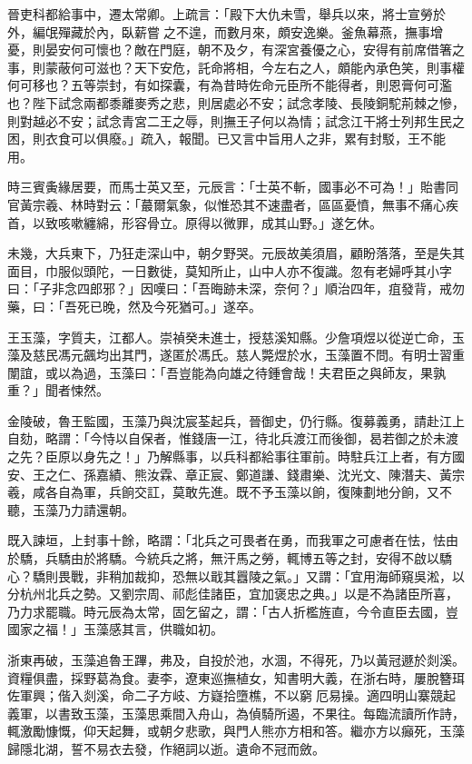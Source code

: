 \begin{pinyinscope}
晉吏科都給事中，遷太常卿。上疏言：「殿下大仇未雪，舉兵以來，將士宣勞於外，編氓殫藏於內，臥薪嘗之不遑，而數月來，頗安逸樂。釜魚幕燕，撫事增憂，則晏安何可懷也？敵在門庭，朝不及夕，有深宮養優之心，安得有前席借箸之事，則蒙蔽何可滋也？天下安危，託命將相，今左右之人，頗能內承色笑，則事權何可移也？五等崇封，有如探囊，有為昔時佐命元臣所不能得者，則恩膏何可濫也？陛下試念兩都黍離麥秀之悲，則居處必不安；試念孝陵、長陵銅駝荊棘之慘，則對越必不安；試念青宮二王之辱，則撫王子何以為情；試念江干將士列邦生民之困，則衣食可以俱廢。」疏入，報聞。已又言中旨用人之非，累有封駁，王不能用。

時三賓夤緣居要，而馬士英又至，元辰言：「士英不斬，國事必不可為！」貽書同官黃宗羲、林時對云：「蕞爾氣象，似惟恐其不速盡者，區區憂憤，無事不痛心疾首，以致咳嗽纏綿，形容骨立。原得以微罪，成其山野。」遂乞休。

未幾，大兵東下，乃狂走深山中，朝夕野哭。元辰故美須眉，顧盼落落，至是失其面目，巾服似頭陀，一日數徙，莫知所止，山中人亦不復識。忽有老婦呼其小字曰：「子非念四郎邪？」因嘆曰：「吾晦跡未深，奈何？」順治四年，疽發背，戒勿藥，曰：「吾死已晚，然及今死猶可。」遂卒。

王玉藻，字質夫，江都人。崇禎癸未進士，授慈溪知縣。少詹項煜以從逆亡命，玉藻及慈民馮元飆均出其門，遂匿於馮氏。慈人斃煜於水，玉藻置不問。有明士習重闈誼，或以為過，玉藻曰：「吾豈能為向雄之待鍾會哉！夫君臣之與師友，果孰重？」聞者悚然。

金陵破，魯王監國，玉藻乃與沈宸荃起兵，晉御史，仍行縣。復募義勇，請赴江上自劾，略謂：「今恃以自保者，惟錢唐一江，待北兵渡江而後御，曷若御之於未渡之先？臣原以身先之！」乃解縣事，以兵科都給事往軍前。時駐兵江上者，有方國安、王之仁、孫嘉績、熊汝霖、章正宸、鄭道謙、錢肅樂、沈光文、陳潛夫、黃宗羲，咸各自為軍，兵餉交訌，莫敢先進。既不予玉藻以餉，復陳劃地分餉，又不聽，玉藻乃力請還朝。

既入諫垣，上封事十餘，略謂：「北兵之可畏者在勇，而我軍之可慮者在怯，怯由於驕，兵驕由於將驕。今統兵之將，無汗馬之勞，輒博五等之封，安得不啟以驕心？驕則畏戰，非稍加裁抑，恐無以戢其囂陵之氣。」又謂：「宜用海師窺吳淞，以分杭州北兵之勢。又劉宗周、祁彪佳諸臣，宜加褒忠之典。」以是不為諸臣所喜，乃力求罷職。時元辰為太常，固乞留之，謂：「古人折檻旌直，今令直臣去國，豈國家之福！」玉藻感其言，供職如初。

浙東再破，玉藻追魯王蹕，弗及，自投於池，水涸，不得死，乃以黃冠遯於剡溪。資糧俱盡，採野葛為食。妻李，遼東巡撫植女，知書明大義，在浙右時，屢脫簪珥佐軍興；偕入剡溪，命二子方岐、方嶷拾墮樵，不以窮厄易操。適四明山寨競起義軍，以書致玉藻，玉藻思乘間入舟山，為偵騎所遏，不果往。每臨流讀所作詩，輒激勵慷慨，仰天起舞，或朝夕悲歌，與門人熊亦方相和答。繼亦方以癲死，玉藻歸隱北湖，誓不易衣去發，作絕詞以逝。遺命不冠而斂。


\end{pinyinscope}
